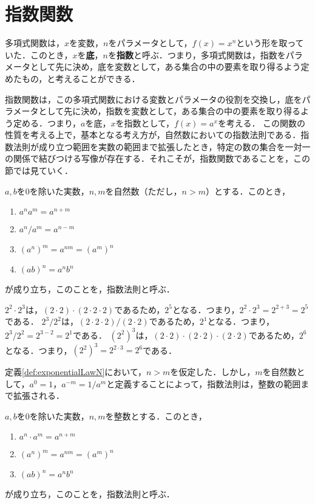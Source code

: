 \section{指数関数}
多項式関数は，$x$を変数，$n$をパラメータとして，$f(x) = x^n$という形を取っていた．このとき，$x$を\textbf{底}，$n$を\textbf{指数}と呼ぶ．つまり，多項式関数は，指数をパラメータとして先に決め，底を変数として，ある集合の中の要素を取り得るよう定めたもの，と考えることができる．

指数関数は，この多項式関数における変数とパラメータの役割を交換し，底をパラメータとして先に決め，指数を変数として，ある集合の中の要素を取り得るよう定める．つまり，$a$を底，$x$を指数として，$f(x) = a^x$を考える．
この関数の性質を考える上で，基本となる考え方が，自然数においての指数法則である．指数法則が成り立つ範囲を実数の範囲まで拡張したとき，特定の数の集合を一対一の関係で結びつける写像が存在する．それこそが，指数関数であることを，この節では見ていく．

\begin{definition}[自然数における指数法則]
	\label{def:exponentialLawN}%
	$a, b$を$0$を除いた実数，$n, m$を自然数（ただし，$n > m$）とする．このとき，
	\begin{enumerate}[1.]
		\item $a^na^m = a^{n+m}$
		\item $a^n / a^m = a^{n-m}$
		\item $\left(a^n\right)^m = a^{nm} = \left(a^m\right)^n$
		\item $\left(ab\right)^n = a^nb^n$
	\end{enumerate}
	が成り立ち，このことを，指数法則と呼ぶ．
\end{definition}
\begin{example*}
	$2^2\cdot 2^3$は，$(2\cdot2)\cdot(2\cdot2\cdot2)$であるため，$2^5$となる．つまり，$2^2\cdot2^3 = 2^{2+3} = 2^5$である．
	$2^3/2^2$は，$(2\cdot2\cdot2)/(2\cdot2)$であるため，$2^1$となる．つまり，$2^3/2^2 = 2^{3-2} = 2^1$である．
	$\left(2^2\right)^3$は，$(2\cdot2)\cdot(2\cdot2)\cdot(2\cdot2)$であるため，$2^6$となる．つまり，$\left(2^2\right)^3 = 2^{2\cdot3} = 2^6$である．
\end{example*}

定義\ref{def:exponentialLawN}において，$n > m$を仮定した．しかし，$m$を自然数として，$a^0 = 1$，$a^{-m} = 1/a^m$と定義することによって，指数法則は，整数の範囲まで拡張される．

\begin{definition}[整数における指数法則]
	\label{def:exponentialLawZ}%
	$a, b$を$0$を除いた実数，$n, m$を整数とする．このとき，
	\begin{enumerate}[1.]
		\item $a^n\cdot a^m = a^{n+m}$
		\item $\left(a^n\right)^m = a^{nm} = \left(a^m\right)^n$
		\item $\left(ab\right)^n = a^nb^n$
	\end{enumerate}
	が成り立ち，このことを，指数法則と呼ぶ．
\end{definition}

